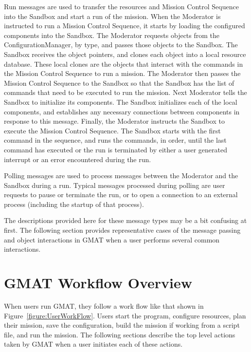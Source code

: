 Run messages are used to transfer the resources and Mission Control Sequence into the Sandbox and
start a run of the mission.  When the Moderator is instructed to run a Mission Control Sequence, it
starts by loading the configured components into the Sandbox.  The Moderator requests objects from
the ConfigurationManager, by type, and passes those objects to the Sandbox.  The Sandbox receives
the object pointers, and clones each object into a local resource database.  These local clones are
the objects that interact with the commands in the Mission Control Sequence to run a mission.  The
Moderator then passes the Mission Control Sequence to the Sandbox so that the Sandbox has the list
of commands that need to be executed to run the mission.  Next Moderator tells the Sandbox to
initialize its components.  The Sandbox initializes each of the local components, and establishes
any necessary connections between components in response to this message.  Finally, the Moderator
instructs the Sandbox to execute the Mission Control Sequence.  The Sandbox starts with the first
command in the sequence, and runs the commands, in order, until the last command has executed or the
run is terminated by either a user generated interrupt or an error encountered during the run.

Polling messages are used to process messages between the Moderator and the Sandbox during a run.
Typical messages processed during polling are user requests to pause or terminate the run, or to
open a connection to an external process (including the startup of that process).

The descriptions provided here for these message types may be a bit confusing at first.  The
following section provides representative cases of the message passing and object interactions in
GMAT when a user performs several common interactions.

\section{\label{section:TopLevelUseCase}GMAT Workflow Overview}

When users run GMAT, they follow a work flow like that shown in Figure~\ref{figure:UserWorkFlow}.
Users start the program, configure resources, plan their mission, save the configuration, build the
mission if working from a script file, and run the mission.  The following sections describe the top
level actions taken by GMAT when a user initiates each of these actions.

